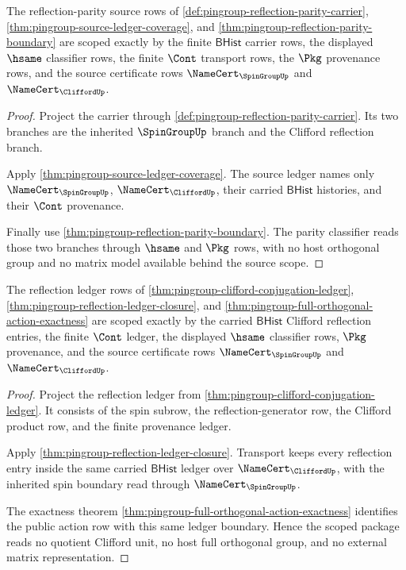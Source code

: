 \begin{theorem}
\label{thm:pingroup-parity-source-scope-package}
The reflection-parity source rows of
\autoref{def:pingroup-reflection-parity-carrier},
\autoref{thm:pingroup-source-ledger-coverage}, and
\autoref{thm:pingroup-reflection-parity-boundary} are scoped exactly by the
finite $\mathsf{BHist}$ carrier rows, the displayed $\hsame$ classifier rows,
the finite $\Cont$ transport rows, the $\Pkg$ provenance rows, and the source
certificate rows $\NameCert_{\SpinGroupUp}$ and
$\NameCert_{\CliffordUp}$.
\end{theorem}
\begin{proof}
Project the carrier through
\autoref{def:pingroup-reflection-parity-carrier}. Its two branches are the
inherited $\SpinGroupUp$ branch and the Clifford reflection branch.

Apply \autoref{thm:pingroup-source-ledger-coverage}. The source ledger names
only $\NameCert_{\SpinGroupUp}$, $\NameCert_{\CliffordUp}$, their carried
$\mathsf{BHist}$ histories, and their $\Cont$ provenance.

Finally use \autoref{thm:pingroup-reflection-parity-boundary}. The parity
classifier reads those two branches through $\hsame$ and $\Pkg$ rows, with no
host orthogonal group and no matrix model available behind the source scope.
\end{proof}

\begin{theorem}
\label{thm:pingroup-reflection-ledger-scope-package}
The reflection ledger rows of
\autoref{thm:pingroup-clifford-conjugation-ledger},
\autoref{thm:pingroup-reflection-ledger-closure}, and
\autoref{thm:pingroup-full-orthogonal-action-exactness} are scoped exactly by
the carried $\mathsf{BHist}$ Clifford reflection entries, the finite $\Cont$
ledger, the displayed $\hsame$ classifier rows, $\Pkg$ provenance, and the
source certificate rows $\NameCert_{\SpinGroupUp}$ and
$\NameCert_{\CliffordUp}$.
\end{theorem}
\begin{proof}
Project the reflection ledger from
\autoref{thm:pingroup-clifford-conjugation-ledger}. It consists of the spin
subrow, the reflection-generator row, the Clifford product row, and the
finite provenance ledger.

Apply \autoref{thm:pingroup-reflection-ledger-closure}. Transport keeps every
reflection entry inside the same carried $\mathsf{BHist}$ ledger over
$\NameCert_{\CliffordUp}$, with the inherited spin boundary read through
$\NameCert_{\SpinGroupUp}$.

The exactness theorem
\autoref{thm:pingroup-full-orthogonal-action-exactness} identifies the public
action row with this same ledger boundary. Hence the scoped package reads no
quotient Clifford unit, no host full orthogonal group, and no external matrix
representation.
\end{proof}


